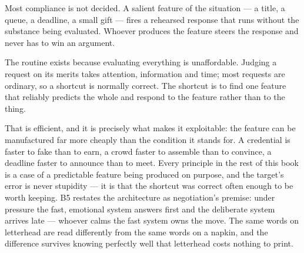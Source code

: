 


\begin{core}
Most compliance is not decided. A salient feature of the situation --- a title, a queue, a deadline, a small gift --- fires a rehearsed response that runs without the substance being evaluated. Whoever produces the feature steers the response and never has to win an argument.
\end{core}

\begin{mechanism}
The routine exists because evaluating everything is unaffordable. Judging a request on its merits takes attention, information and time; most requests are ordinary, so a shortcut is normally correct. The shortcut is to find one feature that reliably predicts the whole and respond to the feature rather than to the thing.

That is efficient, and it is precisely what makes it exploitable: the feature can be manufactured far more cheaply than the condition it stands for. A credential is faster to fake than to earn, a crowd faster to assemble than to convince, a deadline faster to announce than to meet. Every principle in the rest of this book is a case of a predictable feature being produced on purpose, and the target's error is never stupidity --- it is that the shortcut was correct often enough to be worth keeping. B5 restates the architecture as negotiation's premise: under pressure the fast, emotional system answers first and the deliberate system arrives late --- whoever calms the fast system owns the move.
The same words on letterhead are read differently from the same words on a napkin, and the difference survives knowing perfectly well that letterhead costs nothing to print.
\end{mechanism}


